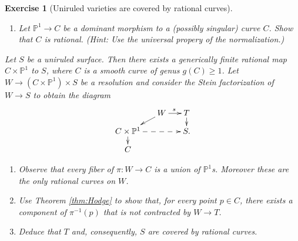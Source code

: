 \documentclass[a4paper,11pt]{amsart}
\newtheorem{exercise}[theorem]{Exercise}
\newcommand{\PP}{\mathbb{P}}
\begin{document}
\begin{exercise}[{Uniruled varieties are covered by rational curves}]
	\leavevmode
	\begin{enumerate}
		\item Let $\PP^1 \to C$ be a dominant morphism to a (possibly singular) curve $C$.
		Show that $C$ is rational.
		{\small (Hint: Use the \emph{universal propery of the normalization}.)}		
	\end{enumerate}
		
	Let $S$ be a uniruled surface.
	Then there exists a generically finite rational map $C \times \PP^1$ to $S$, where $C$ is a smooth curve of genus $g(C) \geq 1$.
	Let $W \to (C\times \PP^1)\times S$ be a resolution and consider the Stein factorization  of $W \to S$ to obtain the diagram
	\[
	\xymatrix@C=.5cm@R=.3cm{
		&W \ar[r]^s \ar[ld] & T \ar[d]\\
		C\times \PP^1 \ar[d] \ar@{-->}[rr] && S.\\
		C
	}
	\]
	\begin{enumerate}[resume]
		\item Observe that every fiber of $\pi\colon W \to C$ is a union of $\PP^1$s.
		Moreover these are the only rational curves on $W$.
		\item Use Theorem \ref{thm:Hodge} to show that, for every point $p \in C$, there exists a component of $\pi^{-1}(p)$ that is not contracted by $W \to T$.
		\item\label{exerit:uniruledCovered5} Deduce that $T$ and, consequently, $S$ are covered by rational curves.
	\end{enumerate}
\end{exercise}
\end{document}
